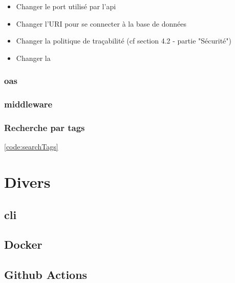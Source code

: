 \begin{itemize}
    \item Changer le port utilisé par l'\Gls{api}
    \item Changer l'URI pour se connecter à la base de données
    \item Changer la politique de traçabilité (cf section 4.2 - partie "Sécurité")
    \item Changer la 
\end{itemize}

\subsubsection{\Gls{oas}}
\subsubsection{\Gls{middleware}}
\subsubsection{Recherche par \glspl{tag}}

\ref{code:searchTags}

\section{Divers}
\label{chapter:solutionDivers}

\subsection{\texorpdfstring{\Gls{cli}}{CLI}}
\subsection{Docker}
\subsection{Github Actions}


